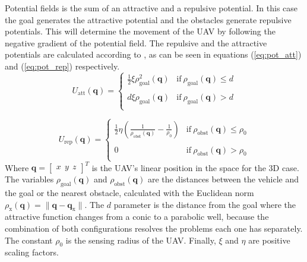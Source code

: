 \documentclass[journal]{IEEEtran}
\newcommand*{\subb}[1]{_{\mathrm{#1}}}
\begin{document}
		Potential fields is the sum of an attractive and a repulsive potential. In this case the goal generates the attractive potential and the obstacles generate repulsive potentials. This will determine the movement of the UAV by following the negative gradient of the potential field. The repulsive and the attractive potentials are calculated according to \cite{potfieldsmethod}, as can be seen in equations (\ref{eq:pot_att}) and (\ref{eq:pot_rep}) respectively.
 		\begin{equation} \label{eq:pot_att}
			U\subb{att}(\bm{q}) =  \left\lbrace  {\begin{array}{cc}
				\frac{1}{2} \xi \rho\subb{goal}^2(\bm{q})& \textrm{if} \ \rho\subb{goal}(\bm{q})\leq d \\
				\\
				d \xi \rho\subb{goal}(\bm{q}) &\textrm{if} \ \rho\subb{goal}(\bm{q})> d \\
				\end{array} } \right.
 		\end{equation}
 		
 		\begin{equation} \label{eq:pot_rep}
 		U\subb{rep}(\bm{q}) =  \left\lbrace  {\begin{array}{cc}
 			\frac{1}{2} \eta (\frac{1}{\rho\subb{obst}(\bm{q})} - \frac{1}{\rho\subb{0}}) &\textrm{if} \ \rho\subb{obst}(\bm{q})\leq \rho\subb{0} \\
 			\\
 			0 &\textrm{if} \ \rho\subb{obst}(\bm{q})> \rho\subb{0} \\
 			\end{array} } \right.
 		\end{equation}
	Where $\bm{q} = \left[ {\begin{array}{ccc} x \ \ y \ \ z \end{array} } \right]^T $ is the UAV's linear position in the space for the 3D case. The variables $\rho\subb{goal}(\bm{q})$ and $\rho\subb{obst}(\bm{q})$ are the distances between the vehicle and the goal or the nearest obstacle, calculated with the Euclidean norm $\rho\subb{x}(\bm{q}) = \parallel \bm{q} - \bm{q\subb{x}}\parallel$. The $d$ parameter is the distance from the goal where the attractive function changes from a conic to a parabolic well, because the combination of both configurations resolves the problems each one has separately. The constant $\rho\subb{0}$ is the sensing radius of the UAV. Finally, $\xi$ and $\eta$ are positive scaling factors. \\
	
\end{document}
